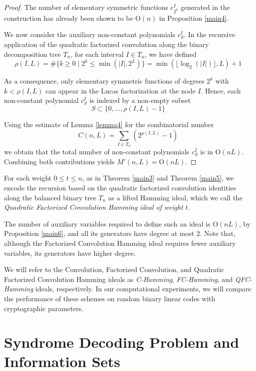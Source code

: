\documentclass{amsart}
\def\cO{{\mathrm{O}}}
\begin{document}
\begin{proof}
The number of elementary symmetric functions $e_{2^k}^I$ generated in the construction
has already been shown to be $\cO(n)$ in Proposition \ref{main4}.

We now consider the auxiliary non-constant polynomials $c_S^I$. In the recursive application
of the quadratic factorized convolution along the binary decomposition tree $T_n$, for each
interval $I\in T_n$, we have defined
\[
\rho(I,L) = \# \{k\geq 0 \mid 2^k \leq \min(|I|,2^L)\} = \min(\lfloor \log_2(|I|)\rfloor, L) + 1
\]

As a consequence, only elementary symmetric functions of degrees $2^k$ with $k < \rho(I,L)$
can appear in the Lucas factorization at the node $I$. Hence, each non-constant
polynomial $c_S^I$ is indexed by a non-empty subset
\[
S\subset \{0,\ldots,\rho(I,L)-1\}
\]

Using the estimate of Lemma \ref{lemma4} for the combinatorial number
\[
C(n,L) = \sum_{I\in T_n} (2^{\rho(I,L)} - 1)
\]
we obtain that the total number of non-constant polynomials $c_S^I$ is in $\cO(nL)$.
Combining both contributions yields $M'(n,L) = \cO(nL)$.
\end{proof}

For each weight $0 \leq t \leq n$, as in Theorem \ref{main3} and Theorem \ref{main5},
we encode the recursion based on the quadratic factorized convolution identities along
the balanced binary tree $T_n$ as a lifted Hamming ideal, which we call the
{\em Quadratic Factorized Convolution Hamming ideal of weight $t$}.

The number of auxiliary variables required to define such an ideal is $\cO(n L)$,
by Proposition \ref{main6}, and all its generators have degree at most 2.
Note that, although the Factorized Convolution Hamming ideal requires fewer
auxiliary variables, its generators have higher degree.

We will refer to the Convolution, Factorized Convolution, and Quadratic Factorized
Convolution Hamming ideals as {\em C-Hamming}, {\em FC-Hamming}, and
{\em QFC-Hamming} ideals, respectively. In our computational experiments,
we will compare the performance of these schemes on random binary linear codes
with cryptographic parameters.


\section{Syndrome Decoding Problem and Information Sets}
\end{document}
